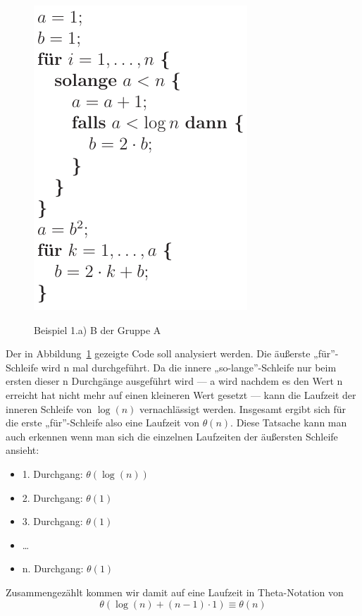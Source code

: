\documentclass[a4paper, 12pt]{article}
\begin{document}
\begin{figure}[htbp]
	\caption{Beispiel 1.a) B der Gruppe A}
	\vskip 0.2cm
	\centering
	\includegraphics{Figures/Test_2011_04_15_AaB}
	\label{figure:Test_2011_04_15_AaB}
\end{figure}

Der in Abbildung~\ref{figure:Test_2011_04_15_AaB} gezeigte Code soll
analysiert werden. Die äußerste „für”-Schleife wird n mal durchgeführt. Da die
innere „so-lange”-Schleife nur beim ersten dieser n Durchgänge ausgeführt wird
— a wird nachdem es den Wert n erreicht hat nicht mehr auf einen kleineren
Wert gesetzt — kann die Laufzeit der inneren Schleife von $\log(n)$
vernachlässigt werden. Insgesamt ergibt sich für die erste „für”-Schleife also
eine Laufzeit von $θ(n)$. Diese Tatsache kann man auch erkennen wenn man sich
die einzelnen Laufzeiten der äußersten Schleife ansieht:

\begin{itemize}
	\item 1. Durchgang: $θ\left(\log(n) \right)$
	\item 2. Durchgang: $θ(1)$
	\item 3. Durchgang: $θ(1)$
	\item …
	\item n. Durchgang: $θ(1)$
\end{itemize}

Zusammengezählt kommen wir damit auf eine Laufzeit in Theta-Notation von
\[θ\left(\log(n)+\left(n-1\right)⋅ 1\right) \equiv θ\left(n\right)\]
\end{document}
